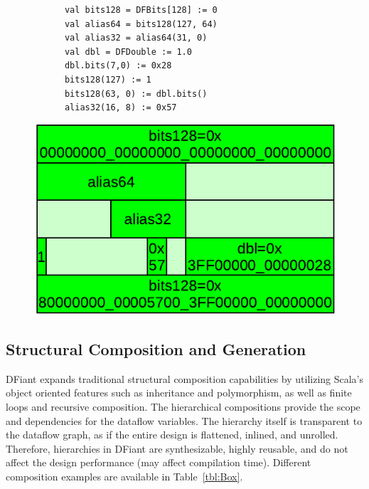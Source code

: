 \begin{figure}[h]
  \centering
  \begin{minipage}[b][3cm][b]{0.57\linewidth}
    \vfill
    \begin{verbatim}
      val bits128 = DFBits[128] := 0
      val alias64 = bits128(127, 64)
      val alias32 = alias64(31, 0)
      val dbl = DFDouble := 1.0
      dbl.bits(7,0) := 0x28
      bits128(127) := 1
      bits128(63, 0) := dbl.bits()
      alias32(16, 8) := 0x57		    
    \end{verbatim}
    \vfill
  \end{minipage}%
  \hfill
  \begin{minipage}[b][3cm][b]{0.42\linewidth}
    \centering
    \vfill
		\includegraphics[width=\linewidth]{graphics/Aliasing.pdf} 
    \vfill
  \end{minipage}
  \label{fig:Aliasing}
\end{figure}


\subsection{Structural Composition and Generation}

DFiant expands traditional structural composition capabilities by utilizing Scala's object oriented features such as inheritance and polymorphism, as well as finite loops and recursive composition. The hierarchical compositions provide the scope and dependencies for the dataflow variables. The hierarchy itself is transparent to the dataflow graph, as if the entire design is flattened, inlined, and unrolled. Therefore, hierarchies in DFiant are synthesizable, highly reusable, and do not affect the design performance (may affect compilation time). Different composition examples are available in Table~\ref{tbl:Box}.

